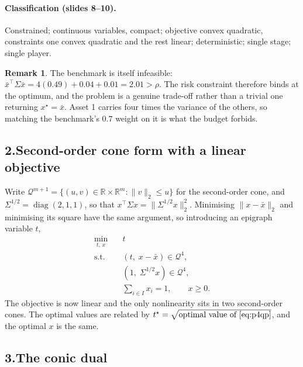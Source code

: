 \documentclass[11pt]{article}
\DeclareMathOperator*{\minimize}{min}
\newcommand{\R}{\mathbb{R}}
\newcommand{\T}{^{\!\top}}
\theoremstyle{definition}
\newtheorem{remark}{Remark}
\begin{document}
\paragraph{Classification (slides 8--10).} Constrained; continuous
variables, compact; objective convex quadratic, constraints one convex
quadratic and the rest linear; deterministic; single stage; single
player.

\begin{remark}
The benchmark is itself infeasible:
$\bar{x}\T\Sigma\bar{x} = 4(0.49)+0.04+0.01 = 2.01 > \rho$. The risk
constraint therefore binds at the optimum, and the problem is a genuine
trade-off rather than a trivial one returning $x^\star = \bar{x}$.
Asset 1 carries four times the variance of the others, so matching the
benchmark's $0.7$ weight on it is what the budget forbids.
\end{remark}

\subsection*{2.\quad Second-order cone form with a linear objective}

Write $\mathcal{Q}^{m+1} = \{(u,v) \in \R \times \R^{m} :
\|v\|_2 \le u\}$ for the second-order cone, and
$\Sigma^{1/2} = \operatorname{diag}(2,1,1)$, so that
$x\T\Sigma x = \|\Sigma^{1/2}x\|_2^2$. Minimising
$\|x-\bar{x}\|_2$ and minimising its square have the same argument, so
introducing an epigraph variable $t$,
\begin{equation}\label{eq:p4socp}
\begin{aligned}
  \minimize_{t,\,x}\quad & t\\
  \text{s.t.}\quad
    & (t,\; x - \bar{x}) \in \mathcal{Q}^{4},\\
    & (1,\; \Sigma^{1/2} x) \in \mathcal{Q}^{4},\\
    & \textstyle\sum_{i \in I} x_i = 1, \qquad x \ge 0 .
\end{aligned}
\end{equation}
The objective is now linear and the only nonlinearity sits in two
second-order cones. The optimal values are related by
$t^\star = \sqrt{\text{optimal value of } \eqref{eq:p4qp}}$, and the
optimal $x$ is the same.

\subsection*{3.\quad The conic dual}
\end{document}
